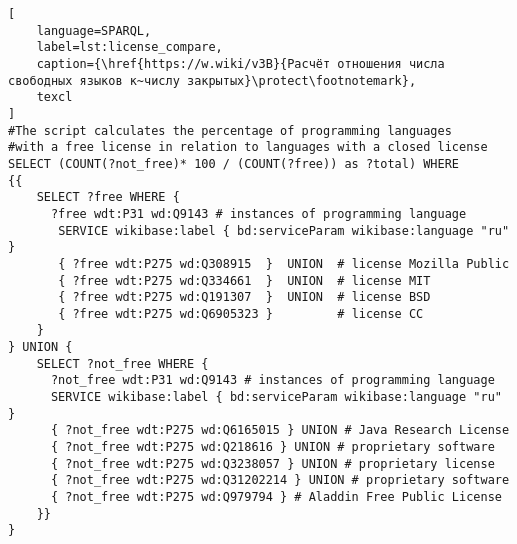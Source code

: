 \newpage
{}
\begin{lstlisting}[
	language=SPARQL,
	label=lst:license_compare,
	caption={\href{https://w.wiki/v3B}{Расчёт отношения числа свободных языков к~числу закрытых}\protect\footnotemark},
	texcl
]
#The script calculates the percentage of programming languages 
#with a free license in relation to languages with a closed license
SELECT (COUNT(?not_free)* 100 / (COUNT(?free)) as ?total) WHERE
{{
    SELECT ?free WHERE {
      ?free wdt:P31 wd:Q9143 # instances of programming language
       SERVICE wikibase:label { bd:serviceParam wikibase:language "ru" }
       { ?free wdt:P275 wd:Q308915  }  UNION  # license Mozilla Public
       { ?free wdt:P275 wd:Q334661  }  UNION  # license MIT
       { ?free wdt:P275 wd:Q191307  }  UNION  # license BSD
       { ?free wdt:P275 wd:Q6905323 }         # license CC
    }
} UNION {
    SELECT ?not_free WHERE {
      ?not_free wdt:P31 wd:Q9143 # instances of programming language
      SERVICE wikibase:label { bd:serviceParam wikibase:language "ru" }
      { ?not_free wdt:P275 wd:Q6165015 } UNION # Java Research License
      { ?not_free wdt:P275 wd:Q218616 } UNION # proprietary software
      { ?not_free wdt:P275 wd:Q3238057 } UNION # proprietary license 
      { ?not_free wdt:P275 wd:Q31202214 } UNION # proprietary software 
      { ?not_free wdt:P275 wd:Q979794 } # Aladdin Free Public License
    }}
}
\end{lstlisting}%






